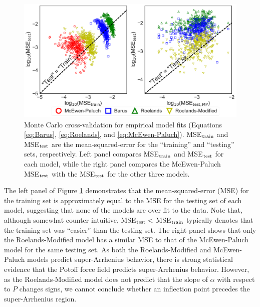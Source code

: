 \documentclass[preprint,review,12pt]{elsarticle}
\begin{document}
	\begin{figure}[htb!]
		\centering
		\includegraphics[width=6.4in]{cross_validation.pdf}
		\caption{Monte Carlo cross-validation for empirical model fits (Equations \ref{eq:Barus}, \ref{eq:Roelands}, and \ref{eq:McEwen-Paluch}). MSE$_{\rm train}$ and MSE$_{\rm test}$ are the mean-squared-error for the ``training'' and ``testing'' sets, respectively. Left panel compares MSE$_{\rm train}$ and MSE$_{\rm test}$ for each model, while the right panel compares the McEwen-Paluch MSE$_{\rm test}$ with the MSE$_{\rm test}$ for the other three models.}
		\label{fig:cross_validation}
	\end{figure}
	
	The left panel of Figure \ref{fig:cross_validation} demonstrates that the mean-squared-error (MSE) for the training set is approximately equal to the MSE for the testing set of each model, suggesting that none of the models are over fit to the data. Note that, although somewhat counter intuitive, MSE$_{\rm test} < $ MSE$_{\rm train}$ typically denotes that the training set was ``easier'' than the testing set. The right panel shows that only the Roelands-Modified model has a similar MSE to that of the McEwen-Paluch model for the same testing set. As both the Roelands-Modified and McEwen-Paluch models predict super-Arrhenius behavior, there is strong statistical evidence that the Potoff force field predicts super-Arrhenius behavior. However, as the Roelands-Modified model does not predict that the slope of $\alpha$ with respect to $P$ changes signs, we cannot conclude whether an inflection point precedes the super-Arrhenius region.
	
	
	
\end{document}
